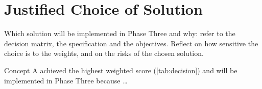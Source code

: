 \section{Justified Choice of Solution}
\label{sec:selected}

\begin{guidance}
Which solution will be implemented in Phase Three and why: refer to the
decision matrix, the specification and the objectives. Reflect on how
sensitive the choice is to the weights, and on the risks of the chosen
solution.
\end{guidance}

Concept A achieved the highest weighted score (\cref{tab:decision}) and
will be implemented in Phase Three because \ldots
